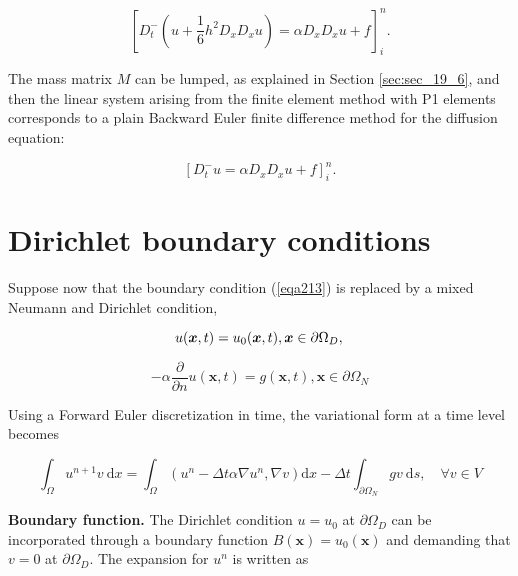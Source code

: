 \documentclass[../main.tex]{subfiles}
\begin{document}
		\begin{equation}
		\label{eqa234}
			\left[D_{t}^{-}\left(u+\frac{1}{6} h^{2} D_{x} D_{x} u\right)=\alpha D_{x} D_{x} u+f\right]_{i}^{n} .
		\end{equation}
	
		The mass matrix $M$ can be lumped, as explained in Section \ref{sec:sec_19_6}, and then the linear system arising from the finite element method with P1 elements corresponds to a plain Backward Euler finite difference method for the diffusion equation:

		\begin{equation}	
		\label{eqa235}
			\left[D_{t}^{-} u=\alpha D_{x} D_{x} u+f\right]_{i}^{n} .
		\end{equation}
	
\section[Dirichlet boundary conditions]{Dirichlet boundary conditions}
	\label{sec:sec_19_8}
		\noindent Suppose now that the boundary condition (\ref{eqa213}) is replaced by a mixed Neumann and Dirichlet condition,
		
		\begin{equation}
		\label{236}
			u(\boldsymbol{x}, t)=u_{0}(\boldsymbol{x}, t),\boldsymbol{x} \in \partial \Omega_{D}, \\
		\end{equation}
	
		\begin{equation}
		\label{237}
			-\alpha \frac{\partial}{\partial n} u(\boldsymbol{x}, t)=g(\boldsymbol{x}, t), \boldsymbol{x} \in \partial \Omega_{N}
		\end{equation}
	
		 Using a Forward Euler discretization in time, the variational form at a time level becomes
		
		\begin{equation}
		\label{eqa238}
			\int_{\Omega} u^{n+1} v \mathrm{~d} x=\int_{\Omega}\left(u^{n}-\Delta t \alpha \nabla u^{n}, \nabla v\right) \mathrm{d} x-\Delta t \int_{\partial \Omega_{N}} g v \mathrm{~d} s, \quad \forall v \in V
		\end{equation}
	
		\noindent \textbf{Boundary function.   } The Dirichlet condition $u=u_{0}$ at $\partial \Omega_{D}$ can be incorporated through a boundary function $B(\boldsymbol{x})=u_{0}(\boldsymbol{x})$ and demanding that $v=0$ at $\partial \Omega_{D}$. The expansion for $u^{n}$ is written as
		
\end{document}
